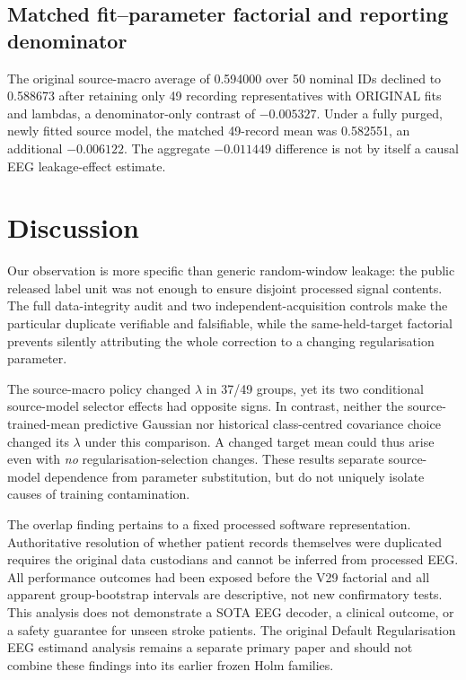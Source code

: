 \documentclass[11pt,a4paper]{article}
\begin{document}
\subsection{Matched fit--parameter factorial and reporting denominator}
The original source-macro average of 0.594000 over 50 nominal IDs
declined to 0.588673 after retaining only 49 recording representatives
with ORIGINAL fits and lambdas, a denominator-only contrast of
$-0.005327$. Under a fully purged, newly fitted source model,
the matched 49-record mean was 0.582551, an additional
$-0.006122$. The aggregate $-0.011449$ difference is
not by itself a causal EEG leakage-effect estimate.



\section{Discussion}
Our observation is more specific than generic random-window leakage:
the public released label unit was not enough to ensure disjoint
processed signal contents. The full data-integrity audit and two
independent-acquisition controls make the particular duplicate
verifiable and falsifiable, while the same-held-target factorial
prevents silently attributing the whole correction to a changing
regularisation parameter.

The source-macro policy changed $\lambda$ in 37/49 groups,
yet its two conditional source-model selector effects had
opposite signs. In contrast, neither the source-trained-mean
predictive Gaussian nor historical class-centred covariance
choice changed its $\lambda$ under this comparison. A changed
target mean could thus arise even with \emph{no}
regularisation-selection changes. These results separate
source-model dependence from parameter substitution, but do
not uniquely isolate causes of training contamination.

The overlap finding pertains to a fixed processed software
representation. Authoritative resolution of whether patient
records themselves were duplicated requires the original
data custodians and cannot be inferred from processed EEG.
All performance outcomes had been exposed before the V29
factorial and all apparent group-bootstrap intervals are
descriptive, not new confirmatory tests. This analysis does
not demonstrate a SOTA EEG decoder, a clinical outcome, or
a safety guarantee for unseen stroke patients. The
original Default Regularisation EEG estimand analysis
remains a separate primary paper and should not combine
these findings into its earlier frozen Holm families.
\end{document}
